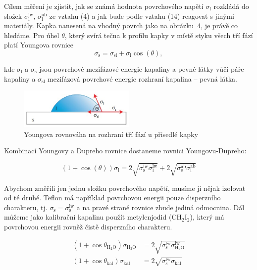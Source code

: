 \documentclass[a4paper,11pt]{article}
\begin{document}
Cílem měření je zjistit, jak se známá hodnota povrchového napětí $\sigma_{\text{l}}$ rozkládá do složek $\sigma_{\text{l}}^{\text{lw}}$, $\sigma_{\text{l}}^{\text{ab}}$ ze vztahu (4) a jak bude podle vztahu (14) reagovat s jinými materiály.  Kapka nanesená na vhodný povrch jako na obrázku~4, je právě co hledáme. Pro úhel $\theta$, který svírá tečna k profilu kapky v místě styku všech tří fází platí Youngova rovnice \\

\begin{equation}
\sigma_{\text{s}} = \sigma_{\text{sl}} + \sigma_{\text{l}}\cos(\theta),
\end{equation}

\noindent
kde $\sigma_{\text{l}}$ a $\sigma_{\text{s}}$ jsou povrchové mezifázové energie kapaliny a pevné látky vůči páře kapaliny a $\sigma_{\text{sl}}$ mezifázová povrchové energie rozhraní kapalina – pevná látka.

\begin{figure}[htpb]
  \centering
  \includegraphics[width=0.5\textwidth]{young.jpg}
  \caption{Youngova rovnováha na rozhraní tří fází u přisedlé kapky}
\end{figure}

Kombinací Youngovy a Dupreho rovnice dostaneme rovnici Youngovu-Dupreho:

\begin{equation}
  (1 + \cos(\theta))\sigma_{\text{l}} =  2 \sqrt{\sigma_{\text{s}}^{\text{lw}}\sigma_{\text{l}}^{\text{lw}}} + 2\sqrt{\sigma_{\text{s}}^{\text{ab}}\sigma_{\text{l}}^{\text{ab}}}
\end{equation}

Abychom změřili jen jednu složku povrchového napětí, musíme ji nějak izolovat od té druhé. Teflon má například povrchovou energii pouze disperzního charakteru, tj. $\sigma_{\text{s}} = \sigma_{\text{s}}^{\text{lw}}$ a na pravé straně rovnice zbude jediná odmocnina. Dál můžeme jako kalibrační kapalinu použít metylenjodid (CH$_{2}$I$_{2}$), který má povrchovou energii rovněž čistě disperzního charakteru.

\begin{align}
  (1 + \cos\theta_{\text{H}_2\text{O}}) \sigma_{\text{H}_2\text{O}} &= 2 \sqrt{\sigma_{\text{s}}^{\text{lw}} \sigma_{\text{H}_2\text{O}}^{\text{lw}}} \\
  (1 + \cos\theta_{\text{kal}}) \sigma_{\text{kal}} &= 2 \sqrt{\sigma_{\text{s}}^{\text{lw}} \sigma_{\text{kal}}}
\end{align}
\end{document}
